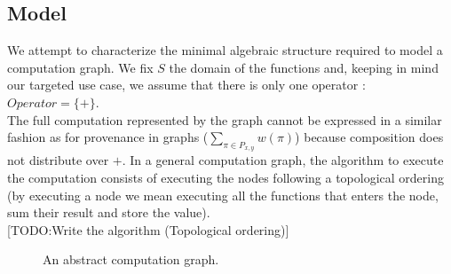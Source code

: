 \documentclass[11pt,a4paper]{article}
\theoremstyle{definition}
\begin{document}
\subsection{Model}


	We attempt to characterize the minimal algebraic structure required to model a computation graph. We fix $S$ the domain of the functions and, keeping in mind our targeted use case, we assume that there is only one operator : $Operator = \{ + \}$. \\

	The full computation represented by the graph cannot be expressed in a similar fashion as for provenance in graphs ($\underset{\pi \in P_{x,y}}{\sum} w(\pi)$) because composition does not distribute over $+$. In a general computation graph, the algorithm to execute the computation consists of executing the nodes following a topological ordering (by executing a node we mean executing all the functions that enters the node, sum their result and store the value).
\\

[TODO:Write the algorithm (Topological ordering)]


	\begin{figure}[!h]
	\centering
	\caption{An abstract computation graph.}
	\label{fig:graphe_calc_abstr}
	\end{figure}
\end{document}
